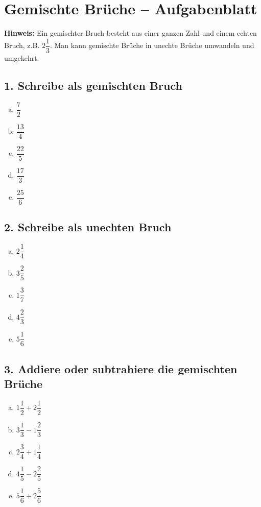 
\section*{Gemischte Brüche – Aufgabenblatt}

\textbf{Hinweis:} Ein gemischter Bruch besteht aus einer ganzen Zahl und einem echten Bruch, z.B. $2\dfrac{1}{3}$. Man kann gemischte Brüche in unechte Brüche umwandeln und umgekehrt.

\subsection*{1. Schreibe als gemischten Bruch}
\begin{enumerate}[a)]
    \item $\dfrac{7}{2}$
    \item $\dfrac{13}{4}$
    \item $\dfrac{22}{5}$
    \item $\dfrac{17}{3}$
    \item $\dfrac{25}{6}$
\end{enumerate}

\subsection*{2. Schreibe als unechten Bruch}
\begin{enumerate}[a)]
    \item $2\dfrac{1}{4}$
    \item $3\dfrac{2}{5}$
    \item $1\dfrac{3}{7}$
    \item $4\dfrac{2}{3}$
    \item $5\dfrac{1}{6}$
\end{enumerate}

\subsection*{3. Addiere oder subtrahiere die gemischten Brüche}
\begin{enumerate}[a)]
    \item $1\dfrac{1}{2} + 2\dfrac{1}{2}$
    \item $3\dfrac{1}{3} - 1\dfrac{2}{3}$
    \item $2\dfrac{3}{4} + 1\dfrac{1}{4}$
    \item $4\dfrac{1}{5} - 2\dfrac{2}{5}$
    \item $5\dfrac{1}{6} + 2\dfrac{5}{6}$
\end{enumerate}

